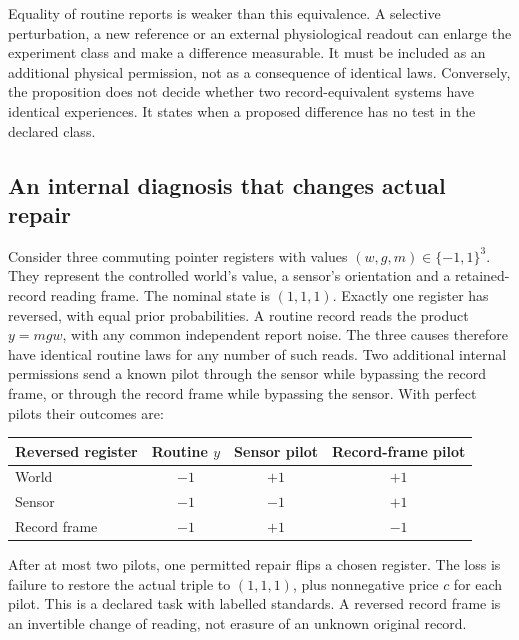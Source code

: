 \documentclass[12pt]{article}
\theoremstyle{definition}
\theoremstyle{remark}
\begin{document}
Equality of routine reports is weaker than this equivalence. A selective
perturbation, a new reference or an external physiological readout can
enlarge the experiment class and make a difference measurable. It must
be included as an additional physical permission, not as a consequence
of identical laws. Conversely, the proposition does not decide whether
two record-equivalent systems have identical experiences. It states
when a proposed difference has no test in the declared class.

\subsection{An internal diagnosis that changes actual repair}

Consider three commuting pointer registers with values
$(w,g,m)\in\{-1,1\}^3$. They represent the controlled world's value,
a sensor's orientation and a retained-record reading frame.
The nominal state is $(1,1,1)$. Exactly one register has reversed,
with equal prior probabilities. A routine record reads the product
$y=mgw$, with any common independent report noise. The three causes
therefore have identical routine laws for any number of such reads.
Two additional internal permissions send a known pilot through the
sensor while bypassing the record frame, or through the record frame
while bypassing the sensor. With perfect pilots their outcomes are:
\begin{center}
\begin{tabular}{@{}lccc@{}}
\toprule
Reversed register & Routine $y$ & Sensor pilot & Record-frame pilot\\
\midrule
World & $-1$ & $+1$ & $+1$\\
Sensor & $-1$ & $-1$ & $+1$\\
Record frame & $-1$ & $+1$ & $-1$\\
\bottomrule
\end{tabular}
\end{center}
After at most two pilots, one permitted repair flips a chosen register.
The loss is failure to restore the actual triple to $(1,1,1)$, plus
nonnegative price $c$ for each pilot. This is a declared task with labelled
standards. A reversed record frame is an invertible change of reading,
not erasure of an unknown original record.
\end{document}
